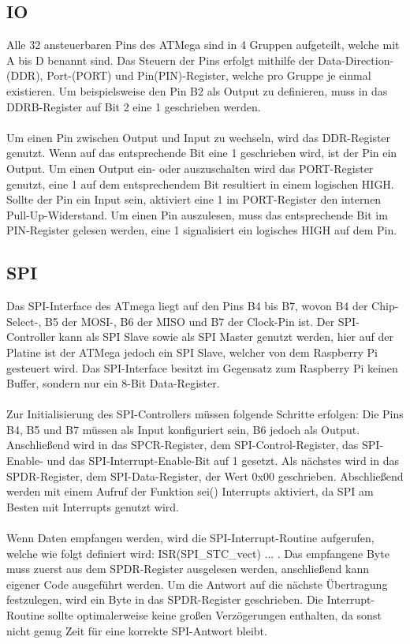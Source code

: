 \documentclass[12pt]{article}
\begin{document}
\subsection{IO}
Alle 32 ansteuerbaren Pins des ATMega sind in 4 Gruppen aufgeteilt, welche mit A bis D benannt sind. Das Steuern der Pins erfolgt mithilfe der Data-Direction-(DDR), Port-(PORT) und Pin(PIN)-Register, welche pro Gruppe je einmal existieren. Um beispielsweise den Pin B2 als Output zu definieren, muss in das DDRB-Register auf Bit 2 eine 1 geschrieben werden.
\\\\Um einen Pin zwischen Output und Input zu wechseln, wird das DDR-Register genutzt. Wenn auf das entsprechende Bit eine 1 geschrieben wird, ist der Pin ein Output. Um einen Output ein- oder auszuschalten wird das PORT-Register genutzt, eine 1 auf dem entsprechendem Bit resultiert in einem logischen HIGH. Sollte der Pin ein Input sein, aktiviert eine 1 im PORT-Register den internen Pull-Up-Widerstand. Um einen Pin auszulesen, muss das entsprechende Bit im PIN-Register gelesen werden, eine 1 signalisiert ein logisches HIGH auf dem Pin.
\newpage\subsection{SPI}
Das SPI-Interface des ATmega liegt auf den Pins B4 bis B7, wovon B4 der Chip-Select-, B5 der MOSI-, B6 der MISO und B7 der Clock-Pin ist. Der SPI-Controller kann als SPI Slave sowie als SPI Master genutzt werden, hier auf der Platine ist der ATMega jedoch ein SPI Slave, welcher von dem Raspberry Pi gesteuert wird. Das SPI-Interface besitzt im Gegensatz zum Raspberry Pi keinen Buffer, sondern nur ein 8-Bit Data-Register.
\\\\Zur Initialisierung des SPI-Controllers müssen folgende Schritte erfolgen: Die Pins B4, B5 und B7 müssen als Input konfiguriert sein, B6 jedoch als Output. Anschließend wird in das SPCR-Register, dem SPI-Control-Register, das SPI-Enable- und das SPI-Interrupt-Enable-Bit auf 1 gesetzt. Als nächstes wird in das SPDR-Register, dem SPI-Data-Register, der Wert 0x00 geschrieben. Abschließend werden mit einem Aufruf der Funktion sei() Interrupts aktiviert, da SPI am Besten mit Interrupts genutzt wird.
\\\\Wenn Daten empfangen werden, wird die SPI-Interrupt-Routine aufgerufen, welche wie folgt definiert wird: ISR(SPI\_STC\_vect) { ... }. Das empfangene Byte muss zuerst aus dem SPDR-Register ausgelesen werden, anschließend kann eigener Code ausgeführt werden. Um die Antwort auf die nächste Übertragung festzulegen, wird ein Byte in das SPDR-Register geschrieben. Die Interrupt-Routine sollte optimalerweise keine großen Verzögerungen enthalten, da sonst nicht genug Zeit für eine korrekte SPI-Antwort bleibt.
\end{document}
